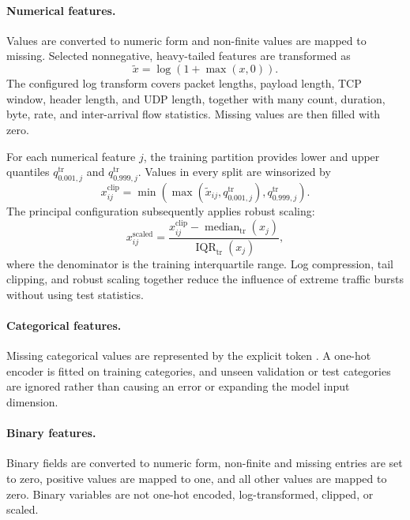 \documentclass[11pt,fleqn]{report}
\begin{document}
\paragraph{Numerical features.}
Values are converted to numeric form and non-finite values are mapped to
missing. Selected nonnegative, heavy-tailed features are transformed as
\begin{equation}
    \widetilde{x}=\log(1+\max(x,0)).
    \label{eq:log1p_preprocessing}
\end{equation}
The configured log transform covers packet lengths, payload length, TCP window,
header length, and UDP length, together with many count, duration, byte, rate,
and inter-arrival flow statistics. Missing values are then filled with zero.

For each numerical feature $j$, the training partition provides lower and
upper quantiles $q_{0.001,j}^{\mathrm{tr}}$ and
$q_{0.999,j}^{\mathrm{tr}}$. Values in every split are winsorized by
\begin{equation}
    x_{ij}^{\mathrm{clip}}
    = \min\!\left(
        \max\!\left(\widetilde{x}_{ij},q_{0.001,j}^{\mathrm{tr}}\right),
        q_{0.999,j}^{\mathrm{tr}}
      \right).
    \label{eq:quantile_clipping}
\end{equation}
The principal configuration subsequently applies robust scaling:
\begin{equation}
    x_{ij}^{\mathrm{scaled}}
    = \frac{x_{ij}^{\mathrm{clip}}-
             \operatorname{median}_{\mathrm{tr}}(x_j)}
            {\operatorname{IQR}_{\mathrm{tr}}(x_j)},
    \label{eq:robust_scaling}
\end{equation}
where the denominator is the training interquartile range. Log compression,
tail clipping, and robust scaling together reduce the influence of extreme
traffic bursts without using test statistics.

\paragraph{Categorical features.}
Missing categorical values are represented by the explicit token
. A one-hot encoder is fitted on training categories,
and unseen validation or test categories are ignored rather than causing an
error or expanding the model input dimension.

\paragraph{Binary features.}
Binary fields are converted to numeric form, non-finite and missing entries are
set to zero, positive values are mapped to one, and all other values are mapped
to zero. Binary variables are not one-hot encoded, log-transformed, clipped, or
scaled.
\end{document}
